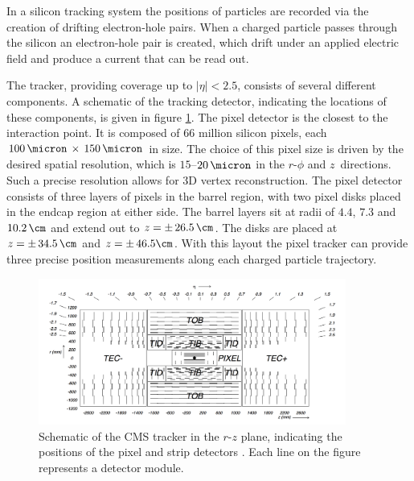 In a silicon tracking system the positions of particles are recorded
via the creation of drifting electron-hole pairs.
When a charged particle passes through the silicon an electron-hole pair
is created, which drift under an applied electric field and produce a current
that can be read out. %

The tracker, providing coverage up to $|\eta|<2.5$, consists of 
several different components. A schematic of the tracking detector, indicating
the locations of these components, is given in figure \ref{fig:CMS_tracker}.
The pixel detector is the closest to the interaction point.
It is composed
of 66 million silicon pixels, each $100\,\micron\,\times\,150\,\micron$ in size.
The choice of this pixel size is driven by the desired spatial resolution,
which is $15$--$20\,\micron$ in the $r$-$\phi$ and $z$~directions. Such a
precise resolution allows for 3D vertex reconstruction. The pixel
detector consists of three layers of pixels in the barrel region, with two pixel disks 
placed in the endcap region at either side. The barrel layers sit at radii of
$4.4$, $7.3$ and $10.2\,\cm$ and extend out to $z=\pm\,26.5\,\cm$. The disks are placed
at $z=\pm\,34.5\,\cm$ and $z=\pm\,46.5\cm$. With this layout the pixel tracker can
provide three precise position measurements along each charged particle trajectory.

\begin{figure}[h!]
\begin{center}
\includegraphics[width=0.9\textwidth]{./Detector/Plots/Tracker.png}
\caption[Schematic of the CMS tracker in the 
$r$-$z$ plane, indicating the positions of the pixel and
strip detectors.]{Schematic of the CMS tracker in the $r$-$z$ plane, indicating the
positions of the pixel and strip detectors \cite{cms-jinst}. Each line 
on the figure represents a detector module.}
\label{fig:CMS_tracker}
\end{center}
\end{figure}

